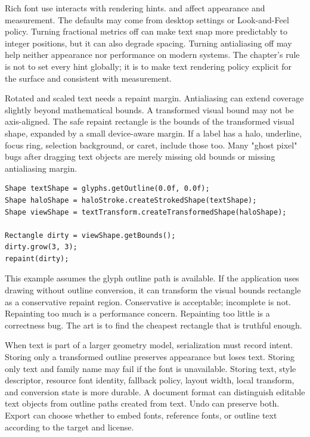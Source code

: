Rich font use interacts with rendering hints.  and  affect appearance and measurement. The defaults may come from desktop settings or Look-and-Feel policy. Turning fractional metrics off can make text snap more predictably to integer positions, but it can also degrade spacing. Turning antialiasing off may help neither appearance nor performance on modern systems. The chapter's rule is not to set every hint globally; it is to make text rendering policy explicit for the surface and consistent with measurement.

Rotated and scaled text needs a repaint margin. Antialiasing can extend coverage slightly beyond mathematical bounds. A transformed visual bound may not be axis-aligned. The safe repaint rectangle is the bounds of the transformed visual shape, expanded by a small device-aware margin. If a label has a halo, underline, focus ring, selection background, or caret, include those too. Many "ghost pixel" bugs after dragging text objects are merely missing old bounds or missing antialiasing margin.

\begin{lstlisting}[caption={Repaint bounds for transformed text with a halo.}]
Shape textShape = glyphs.getOutline(0.0f, 0.0f);
Shape haloShape = haloStroke.createStrokedShape(textShape);
Shape viewShape = textTransform.createTransformedShape(haloShape);

Rectangle dirty = viewShape.getBounds();
dirty.grow(3, 3);
repaint(dirty);
\end{lstlisting}

This example assumes the glyph outline path is available. If the application uses  drawing without outline conversion, it can transform the visual bounds rectangle as a conservative repaint region. Conservative is acceptable; incomplete is not. Repainting too much is a performance concern. Repainting too little is a correctness bug. The art is to find the cheapest rectangle that is truthful enough.

When text is part of a larger geometry model, serialization must record intent. Storing only a transformed outline preserves appearance but loses text. Storing only text and family name may fail if the font is unavailable. Storing text, style descriptor, resource font identity, fallback policy, layout width, local transform, and conversion state is more durable. A document format can distinguish editable text objects from outline paths created from text. Undo can preserve both. Export can choose whether to embed fonts, reference fonts, or outline text according to the target and license.

